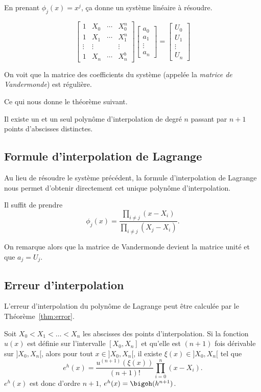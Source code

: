 En prenant $\phi_j(x) = x^j$, ça donne un système linéaire à résoudre.

\[\begin{bmatrix}
	1 			& X_0 		& \cdots & X_0^n  \\
	1 			& X_1 		& \cdots & X_1^n  \\
	\vdots	& \vdots 	& 			 & \vdots \\
	1 			& X_n 		& \cdots & X_n^b
\end{bmatrix}
\begin{bmatrix}
	a_0 			\\
	a_1 			\\
	\vdots	\\
	a_n 			
\end{bmatrix}
=
\begin{bmatrix}
	U_0 			\\
	U_1 			\\
	\vdots	\\
	U_n 			
\end{bmatrix}\]

On voit que la matrice des coefficients du système (appelée la \textit{matrice
de Vandermonde}) est régulière.

Ce qui nous donne le théorème suivant.
\begin{mytheo}
  Il existe un et un seul polynôme d'interpolation de degré $n$ passant
  par $n+1$ points d'abscisses distinctes.
\end{mytheo}

\subsection{Formule d'interpolation de Lagrange}
Au lieu de résoudre le système précédent, la formule d'interpolation
de Lagrange nous permet d'obtenir directement cet unique polynôme
d'interpolation.

Il suffit de prendre 
\[
  \phi_j(x) = \frac{\prod_{i \neq j} (x - X_i)}
  {\prod_{i \neq j} (X_j - X_i)}.
\]

On remarque alors que la matrice de Vandermonde devient la matrice
unité et que $a_j = U_j$.

\subsection{Erreur d'interpolation}
L'erreur d'interpolation du polynôme de Lagrange peut être calculée
par le Théorème~\ref{thm:error}.
\begin{mytheo}
  \label{thm:error}
  Soit $X_0 < X_1 < \ldots < X_n$ les abscisses des points d'interpolation.
  Si la fonction $u(x)$ est définie sur l'intervalle $[X_0, X_n]$ et qu'elle
  est $(n+1)$ fois dérivable sur $]X_0, X_n[$, alors pour tout
  $x \in ]X_0, X_n[$, il existe $\xi(x) \in ]X_0, X_n[$ tel que
  \[ e^h(x) = \frac{u^{(n+1)}(\xi(x))}{(n+1)!}
  \prod_{i=0}^n (x - X_i). \]
  $e^h(x)$ est donc d'ordre $n+1$, $e^h(x) = \bigoh(h^{n+1})$.
\end{mytheo}

